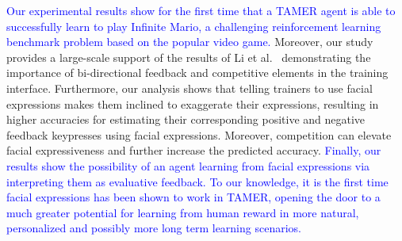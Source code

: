 \textcolor{blue}{Our experimental results show for the first time that a TAMER agent is %
able to successfully learn to play Infinite Mario, a challenging reinforcement learning benchmark problem ba\-sed on the popular video game.} %
Moreover, our study provides a large-scale support of the results of Li et al.\ \cite{li2016using,li2017social} demonstrating the importance of bi-directional feedback and competitive elements in the training interface. %
Furthermore, our analysis shows that telling trainers to use facial expressions makes them inclined to exaggerate their expressions, resulting in higher accuracies for estimating their corresponding positive and negative feedback keypresses using facial expressions. Moreover, competition can elevate facial expressiveness and further increase the predicted accuracy. \textcolor{blue}{Finally, our results show the possibility of an agent learning from facial expressions via interpreting them as %
evaluative feedback. %
To our knowledge, it is the first time facial expressions %
has been shown to work in TAMER, opening the door to a much greater potential for learning from human reward in more natural, personalized and possibly more long term learning scenarios.}

